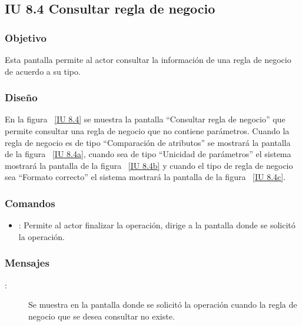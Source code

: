 \newpage 
\subsection{IU 8.4 Consultar regla de negocio}

\subsubsection{Objetivo}
	
	Esta pantalla permite al actor consultar la información de una regla de negocio de acuerdo a su tipo.

\subsubsection{Diseño}

    En la figura ~\ref{IU 8.4} se muestra la pantalla ``Consultar regla de negocio'' que permite consultar una regla de negocio que no contiene parámetros. 
    Cuando la regla de negocio es de tipo ``Comparación de atributos'' se mostrará la pantalla de la figura ~\ref{IU 8.4a}, cuando sea de tipo ``Unicidad de parámetros''
    el sistema mostrará la pantalla de la figura ~\ref{IU 8.4b} y cuando el tipo de regla de negocio sea ``Formato correcto'' el sistema mostrará la pantalla de
    la figura ~\ref{IU 8.4c}.\\



\subsubsection{Comandos}
\begin{itemize}
	\item {}: Permite al actor finalizar la operación, dirige a la pantalla donde se solicitó la operación.
\end{itemize}

\subsubsection{Mensajes}
	
\begin{description}
	\item[:] Se muestra en la pantalla donde se solicitó la operación cuando la regla de negocio que se desea consultar no existe.
\end{description}
